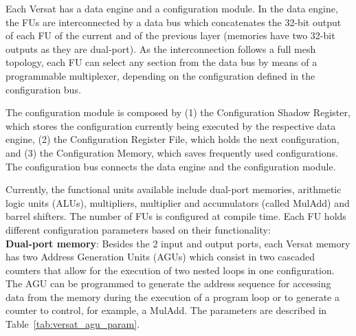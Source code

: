 Each Versat has a data engine and a configuration module. In the data engine,
the FUs are interconnected by a data bus which concatenates the 32-bit output of
each FU of the current and of the previous layer (memories have two 32-bit
outputs as they are dual-port). As the interconnection follows a full mesh
topology, each FU can select any section from the data bus by means of a
programmable multiplexer, depending on the configuration defined in the
configuration bus.

The configuration module is composed by (1) the Configuration Shadow Register,
which stores the configuration currently being executed by the respective data
engine, (2) the Configuration Register File, which holds the next configuration,
and (3) the Configuration Memory, which saves frequently used configurations. The configuration bus connects the data engine and the configuration
module.

Currently, the functional units available include dual-port memories, arithmetic
logic units (ALUs), multipliers, multiplier and accumulators (called MulAdd) and
barrel shifters. The number of FUs is configured at compile time. Each FU holds
different configuration parameters based on their functionality: \\

\vspace{-0.4cm} \textbf{Dual-port memory}: Besides the 2 input and output ports,
each Versat memory has two Address Generation Units (AGUs) which consist in two
cascaded counters that allow for the execution of two nested loops in one
configuration. The AGU can be programmed to generate the address sequence for
accessing data from the memory during the execution of a program loop or to
generate a counter to control, for example, a MulAdd. The parameters are
described in Table~\ref{tab:versat_agu_param}.


